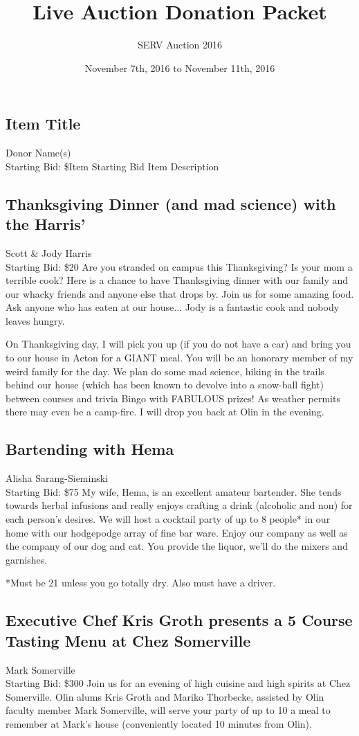 \documentclass[11pt]{article}
\title{Live Auction Donation Packet}
\author{SERV Auction 2016}
\date{November 7th, 2016 to November 11th, 2016}
\begin{document}
\maketitle
\subsection{Item Title}
Donor Name(s)
\\
Starting Bid: \$Item Starting Bid
\newline
Item Description
\subsection{Thanksgiving Dinner (and mad science) with the Harris'}
Scott \& Jody Harris
\\
Starting Bid: \$20
\newline
Are you stranded on campus this Thanksgiving? Is your mom a terrible cook? Here is a chance to have Thanksgiving dinner with our family and our whacky friends and anyone else that drops by. Join us for some amazing food. Ask anyone who has eaten at our house... Jody is a fantastic cook and nobody leaves hungry.

On Thanksgiving day, I will pick you up (if you do not have a car) and bring you to our house in Acton for a GIANT meal. You will be an honorary member of my weird family for the day. We plan do some mad science, hiking in the trails behind our house (which has been known to devolve into a snow-ball fight) between courses and trivia Bingo with FABULOUS prizes!  As weather permits there may even be a camp-fire. I will drop you back at Olin in the evening.
\subsection{Bartending with Hema}
Alisha Sarang-Sieminski
\\
Starting Bid: \$75
\newline
My wife, Hema, is an excellent amateur bartender. She tends towards herbal infusions and really enjoys crafting a drink (alcoholic and non) for each person's desires. We will host a cocktail party of up to 8 people* in our home with our hodgepodge array of fine bar ware.  Enjoy our company as well as the company of our dog and cat. You provide the liquor, we'll do the mixers and garnishes.

*Must be 21 unless you go totally dry. Also must have a driver.
\subsection{Executive Chef Kris Groth presents a 5 Course Tasting Menu at Chez Somerville}
Mark Somerville
\\
Starting Bid: \$300
\newline
Join us for an evening of high cuisine and high spirits at Chez Somerville.  Olin alums Kris Groth and Mariko Thorbecke, assisted by Olin faculty member Mark Somerville, will serve your party of up to 10  a meal to remember at Mark's house (conveniently located 10 minutes from Olin). 
\end{document}
